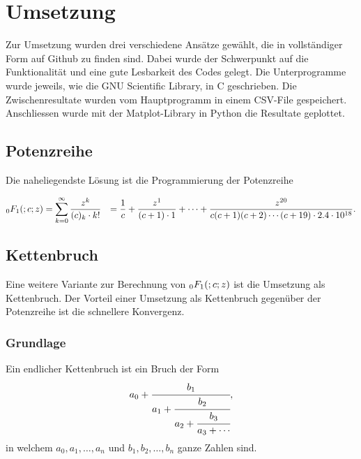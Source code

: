 %
%
%
\section{Umsetzung
\label{0f1:section:teil2}}
Zur Umsetzung wurden drei verschiedene Ansätze gewählt, die in vollständiger Form auf Github \cite{0f1:code} zu finden sind. Dabei wurde der Schwerpunkt auf die Funktionalität und eine gute Lesbarkeit des Codes gelegt.
Die Unterprogramme wurde jeweils, wie die GNU Scientific Library, in C geschrieben. Die Zwischenresultate wurden vom Hauptprogramm in einem CSV-File gespeichert. Anschliessen wurde mit der Matplot-Library in Python die Resultate geplottet.

\subsection{Potenzreihe
\label{0f1:subsection:potenzreihe}}
Die naheliegendste Lösung ist die Programmierung der Potenzreihe

\begin{align}
    \label{0f1:umsetzung:0f1:eq}
    \mathstrut_0F_1(;c;z)
    &=
    \sum_{k=0}^\infty
    \frac{z^k}{(c)_k \cdot k!}
    &= 
    \frac{1}{c}
    +\frac{z^1}{(c+1) \cdot 1}
    + \cdots
    + \frac{z^{20}}{c(c+1)(c+2)\cdots(c+19) \cdot 2.4 \cdot 10^{18}}.
\end{align}



\subsection{Kettenbruch
\label{0f1:subsection:kettenbruch}}
Eine weitere Variante zur Berechnung von $\mathstrut_0F_1(;c;z)$ ist die Umsetzung als Kettenbruch.
Der Vorteil einer Umsetzung als Kettenbruch gegenüber der Potenzreihe ist die schnellere Konvergenz.

\subsubsection{Grundlage}
Ein endlicher Kettenbruch \cite{0f1:wiki-kettenbruch} ist ein Bruch der Form
\begin{equation*}
a_0 + \cfrac{b_1}{a_1+\cfrac{b_2}{a_2+\cfrac{b_3}{a_3+\cdots}}},
\end{equation*}
in welchem $a_0, a_1,\dots,a_n$ und $b_1,b_2,\dots,b_n$ ganze Zahlen sind.


